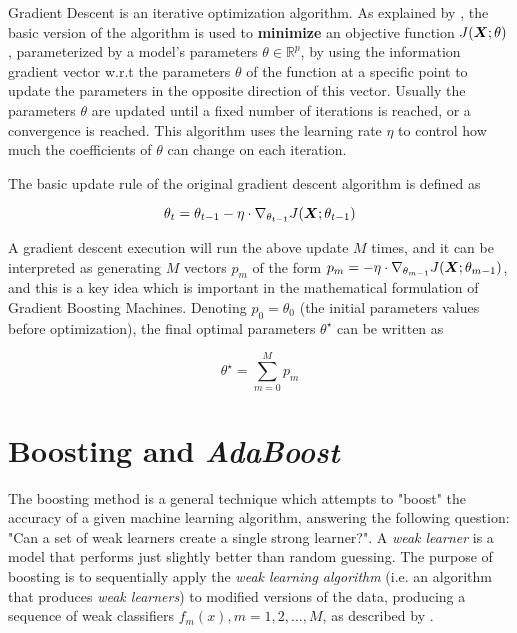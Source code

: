 Gradient Descent is an iterative optimization algorithm. As explained by \cite{Ruder2016AnOO}, the basic version of the algorithm is used to \textbf{minimize} an objective function $J(\bm{X};\theta)$, parameterized by a model's parameters $\theta \in \mathbb{R}^p$, by using the information gradient vector w.r.t the parameters $\theta$ of the function at a specific point to update the parameters in the opposite direction of this vector. Usually the parameters $\theta$ are updated until a fixed number of iterations is reached, or a convergence is reached. This algorithm uses the learning rate $\eta$ to control how much the coefficients of $\theta$ can change on each iteration.

The basic update rule of the original gradient descent algorithm is defined as

\begin{equation}\label{eq:gradientDescent-update}
    \theta_t = \theta_{t-1} - \eta \cdot \nabla_{\theta_{t-1}} J(\bm{X};\theta_{t-1})  
\end{equation}

A gradient descent execution will run the above update $M$ times, and it can be interpreted as generating $M$ vectors $p_m$ of the form $p_m = -\eta\cdot\nabla_{\theta_{m-1}}J(\bm{X};\theta_{m-1})$, and  this is a key idea which is important in the mathematical formulation of Gradient Boosting Machines. 
Denoting $p_0 = \theta_0$ (the initial parameters values before optimization), the final optimal parameters $\theta^\star$ can be written as

\begin{equation}\label{eq:gradientDescent-params}
    \theta^\star = \sum_{m=0}^{M}p_m
\end{equation}

\section{Boosting and \textit{AdaBoost}}

The boosting method is a general technique which attempts to "boost" the accuracy of a given machine learning algorithm, answering the following question: "Can a set of weak learners create a single strong learner?". A \textit{weak learner} is a model that performs just slightly better than random guessing. The purpose of boosting is to sequentially apply the \textit{weak learning algorithm} (i.e. an algorithm that produces \textit{weak learners}) to modified versions of the data, producing a sequence of weak classifiers $f_m(x), m = 1, 2, ..., M$, as described by \cite{hastie2009elements}. 

